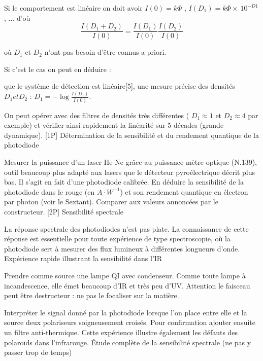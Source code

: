 \documentclass{article}%
\begin{document}
Si le comportement est linéaire on doit avoir $I(0) = k\Phi$ , $I(D_{1}) = k\Phi \times\ 10^{ - D1 }$, ... d'où
\[ \frac{I(D_1 + D_2 )}{I(0)} = \frac{I(D_1 )}{I(0)} \frac{I(D_2 )}{I(0)} \]

où $D_{1}$ et $D_{2}$ n'ont pas besoin d'être connus a priori.

Si c'est le cas on peut en déduire :

    que le système de détection est linéaire[5],
    une mesure précise des densités $D_{1} et D_{2}$ : $D_1 = - \log\frac{I(D_1 )}{I(0)}$.

On peut opérer avec des filtres de densités très différentes ( $D_{1} \approx 1$ et $D_{2} \approx 4$ par exemple) et vérifier ainsi rapidement la linéarité sur 5 décades (grande dynamique).
[1P] Détermination de la sensibilité et du rendement quantique de la photodiode

Mesurer la puissance d'un laser He-Ne grâce au puissance-mètre optique (N.139), outil beaucoup plus adapté aux lasers que le détecteur pyroélectrique décrit plus bas. Il s'agit en fait d'une photodiode calibrée. En déduire la sensibilité de la photodiode dans le rouge (en $A \cdot W^{-1}$) et son rendement quantique en électron par photon (voir le Sextant). Comparer aux valeurs annoncées par le constructeur.
[2P] Sensibilité spectrale

La réponse spectrale des photodiodes n'est pas plate. La connaissance de cette réponse est essentielle pour toute expérience de type spectroscopie, où la photodiode sert à mesurer des flux lumineux à différentes longueurs d'onde.
Expérience rapide illustrant la sensibilité dans l'IR

Prendre comme source une lampe QI avec condenseur. Comme toute lampe à incandescence, elle émet beaucoup d'IR et très peu d'UV. Attention le faisceau peut être destructeur : ne pas le focaliser sur la matière.

Interpréter le signal donné par la photodiode lorsque l'on place entre elle et la source deux polariseurs soigneusement croisés. Pour confirmation ajouter ensuite un filtre anti-thermique. Cette expérience illustre également les défauts des polaroïds dans l'infrarouge.
Étude complète de la sensibilité spectrale (ne pas y passer trop de temps)
\end{document}
